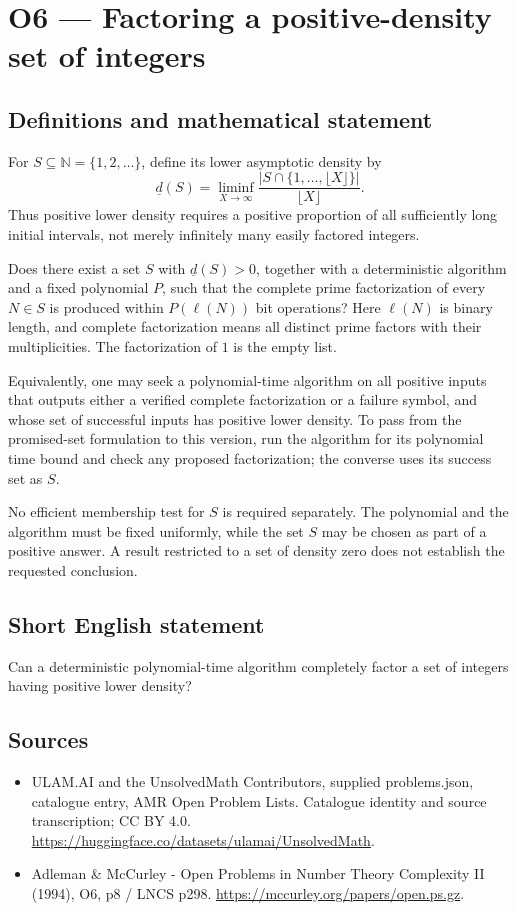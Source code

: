 \documentclass[11pt,a4paper]{article}
\begin{document}
\section*{O6 — Factoring a positive-density set of integers}\label{statement}

\subsection{Definitions and mathematical statement}
For $S\subseteq\mathbb N=\{1,2,\ldots\}$, define its lower asymptotic density by
\[
\underline d(S)=\liminf_{X\to\infty}\frac{|S\cap\{1,\ldots,\lfloor X\rfloor\}|}{\lfloor X\rfloor}.
\]
Thus positive lower density requires a positive proportion of all sufficiently long initial intervals, not merely infinitely many easily factored integers.

Does there exist a set $S$ with $\underline d(S)>0$, together with a deterministic algorithm and a fixed polynomial $P$, such that the complete prime factorization of every $N\in S$ is produced within $P(\ell(N))$ bit operations? Here $\ell(N)$ is binary length, and complete factorization means all distinct prime factors with their multiplicities. The factorization of $1$ is the empty list.

Equivalently, one may seek a polynomial-time algorithm on all positive inputs that outputs either a verified complete factorization or a failure symbol, and whose set of successful inputs has positive lower density. To pass from the promised-set formulation to this version, run the algorithm for its polynomial time bound and check any proposed factorization; the converse uses its success set as $S$.

No efficient membership test for $S$ is required separately. The polynomial and the algorithm must be fixed uniformly, while the set $S$ may be chosen as part of a positive answer. A result restricted to a set of density zero does not establish the requested conclusion.
\subsection{Short English statement}
Can a deterministic polynomial-time algorithm completely factor a set of integers having positive lower density?
\subsection{Sources}
\begin{itemize}
\item[S1] ULAM.AI and the UnsolvedMath Contributors, supplied problems.json, catalogue entry, AMR Open Problem Lists. Catalogue identity and source transcription; CC BY 4.0.
\url{https://huggingface.co/datasets/ulamai/UnsolvedMath}.
\item[S2] Adleman \& McCurley - Open Problems in Number Theory Complexity II (1994), O6, p8 / LNCS p298. 
\url{https://mccurley.org/papers/open.ps.gz}.
\end{itemize}
\end{document}
